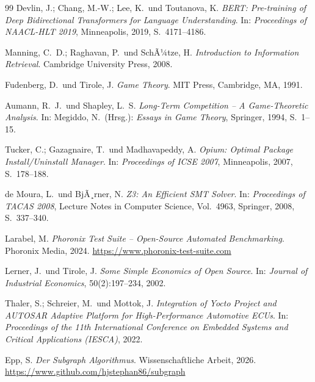 ﻿\documentclass[a4paper,12pt]{article}
\theoremstyle{definition}
\begin{document}
\begin{thebibliography}{99}
Devlin, J.; Chang, M.-W.; Lee, K.\ und Toutanova, K.
\textit{BERT: Pre-training of Deep Bidirectional Transformers for Language Understanding}.
In: \textit{Proceedings of NAACL-HLT 2019}, Minneapolis, 2019, S.\ 4171--4186.

Manning, C.\ D.; Raghavan, P.\ und SchÃ¼tze, H.
\textit{Introduction to Information Retrieval}.
Cambridge University Press, 2008.

Fudenberg, D.\ und Tirole, J.
\textit{Game Theory}.
MIT Press, Cambridge, MA, 1991.

Aumann, R.\ J.\ und Shapley, L.\ S.
\textit{Long-Term Competition -- A Game-Theoretic Analysis}.
In: Megiddo, N.\ (Hrsg.): \textit{Essays in Game Theory}, Springer, 1994, S.\ 1--15.

Tucker, C.; Gazagnaire, T.\ und Madhavapeddy, A.
\textit{Opium: Optimal Package Install/Uninstall Manager}.
In: \textit{Proceedings of ICSE 2007}, Minneapolis, 2007, S.\ 178--188.

de Moura, L.\ und BjÃ¸rner, N.
\textit{Z3: An Efficient SMT Solver}.
In: \textit{Proceedings of TACAS 2008}, Lecture Notes in Computer Science, Vol.\ 4963,
Springer, 2008, S.\ 337--340.

Larabel, M.
\textit{Phoronix Test Suite -- Open-Source Automated Benchmarking}.
Phoronix Media, 2024.
\url{https://www.phoronix-test-suite.com}

Lerner, J.\ und Tirole, J.
\textit{Some Simple Economics of Open Source}.
In: \textit{Journal of Industrial Economics}, 50(2):197--234, 2002.

Thaler, S.; Schreier, M.\ und Mottok, J.
\textit{Integration of Yocto Project and AUTOSAR Adaptive Platform for
High-Performance Automotive ECUs}.
In: \textit{Proceedings of the 11th International Conference on Embedded Systems
and Critical Applications (IESCA)}, 2022.

Epp, S.
\textit{Der Subgraph Algorithmus}.
Wissenschaftliche Arbeit, 2026.
\url{https://www.github.com/hjstephan86/subgraph}

\end{thebibliography}
\end{document}
